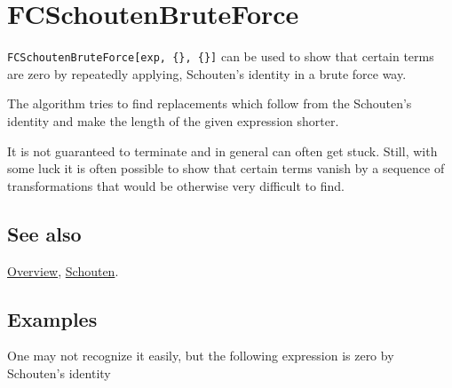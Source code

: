 \documentclass[../FeynCalcManual.tex]{subfiles}
\begin{document}
\hypertarget{fcschoutenbruteforce}{
\section{FCSchoutenBruteForce}\label{fcschoutenbruteforce}}

\texttt{FCSchoutenBruteForce[\allowbreak{}exp,\ \allowbreak{}\{\allowbreak{}\},\ \allowbreak{}\{\allowbreak{}\}]}
can be used to show that certain terms are zero by repeatedly applying,
Schouten's identity in a brute force way.

The algorithm tries to find replacements which follow from the
Schouten's identity and make the length of the given expression shorter.

It is not guaranteed to terminate and in general can often get stuck.
Still, with some luck it is often possible to show that certain terms
vanish by a sequence of transformations that would be otherwise very
difficult to find.

\subsection{See also}

\hyperlink{toc}{Overview}, \hyperlink{schouten}{Schouten}.

\subsection{Examples}

One may not recognize it easily, but the following expression is zero by
Schouten's identity
\end{document}
